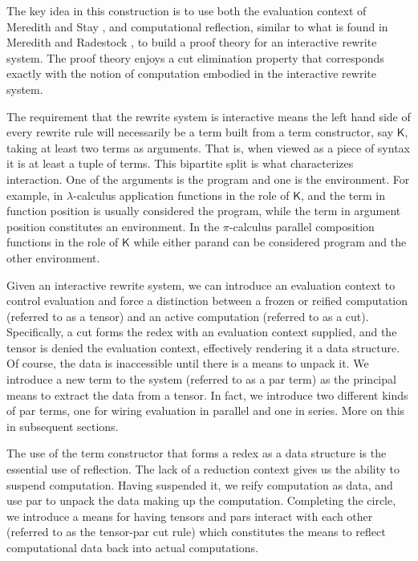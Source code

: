 \documentclass{llncs}
\renewcommand{\:}{\colon}
\newcommand{\pic}{$\pi$-calculus}
\newcommand{\lamc}{$\lambda$-calculus}
\begin{document}
The key idea in this construction is to use both the evaluation
context of Meredith and Stay \cite{DBLP:journals/corr/StayM15}, and
computational reflection, similar to what is found in Meredith and
Radestock \cite{DBLP:journals/entcs/MeredithR05}, to build a proof
theory for an interactive rewrite system. The proof theory enjoys a
cut elimination property that corresponds exactly with the notion of
computation embodied in the interactive rewrite system.

The requirement that the rewrite system is interactive means the left
hand side of every rewrite rule will necessarily be a term built from
a term constructor, say $\mathsf{K}$, taking at least two terms as
arguments. That is, when viewed as a piece of syntax it is at least a
tuple of terms. This bipartite split is what characterizes
interaction. One of the arguments is the program and one is the
environment. For example, in {\lamc} application functions
in the role of $\mathsf{K}$, and the term in function position is
usually considered the program, while the term in argument position
constitutes an environment. In the {\pic} parallel composition
functions in the role of $\mathsf{K}$ while either parand can be
considered program and the other environment.

Given an interactive rewrite system, we can introduce an evaluation
context to control evaluation and force a distinction between a frozen
or reified computation (referred to as a tensor) and an active
computation (referred to as a cut). Specifically, a cut forms the
redex with an evaluation context supplied, and the tensor is denied
the evaluation context, effectively rendering it a data structure. Of
course, the data is inaccessible until there is a means to unpack
it. We introduce a new term to the system (referred to as a par term)
as the principal means to extract the data from a tensor. In fact, we
introduce two different kinds of par terms, one for wiring evaluation
in parallel and one in series. More on this in subsequent sections.

The use of the term constructor that forms a redex as a data structure
is the essential use of reflection. The lack of a reduction context
gives us the ability to suspend computation. Having suspended it, we
reify computation as data, and use par to unpack the data making up
the computation. Completing the circle, we introduce a means for
having tensors and pars interact with each other (referred to as the tensor-par cut
rule) which constitutes the means to reflect computational data back into
actual computations.
\end{document}
